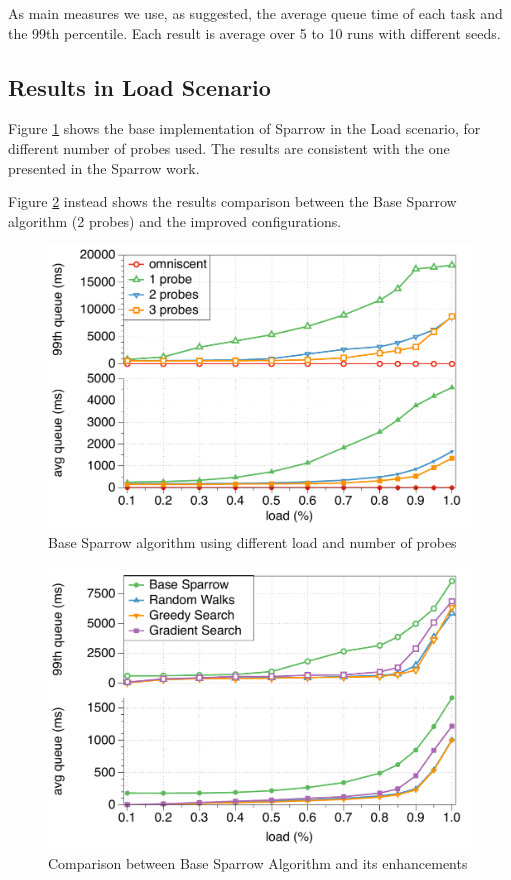 \documentclass[conference]{IEEEtran}
\begin{document}
As main measures we use, as suggested, the average queue time of each task and the 99th percentile. Each result is average over 5 to 10 runs with different seeds.

\subsection{Results in Load Scenario}

Figure \ref{fig:probes} shows the base implementation of Sparrow in the Load scenario, for different number of probes used. The results are consistent with the one presented in the Sparrow work.

Figure \ref{fig:comparison} instead shows the results comparison between the Base Sparrow algorithm (2 probes) and the improved configurations.

\begin{figure}
\begin{center}
\includegraphics[scale=0.45]{figures/probes_new}
\caption{Base Sparrow algorithm using different load and number of probes}
\label{fig:probes}
\end{center}
\end{figure}

\begin{figure}
\begin{center}
\includegraphics[scale=0.45]{figures/comparison_new}
\caption{Comparison between Base Sparrow Algorithm and its enhancements}
\label{fig:comparison}
\end{center}
\end{figure}
\end{document}
